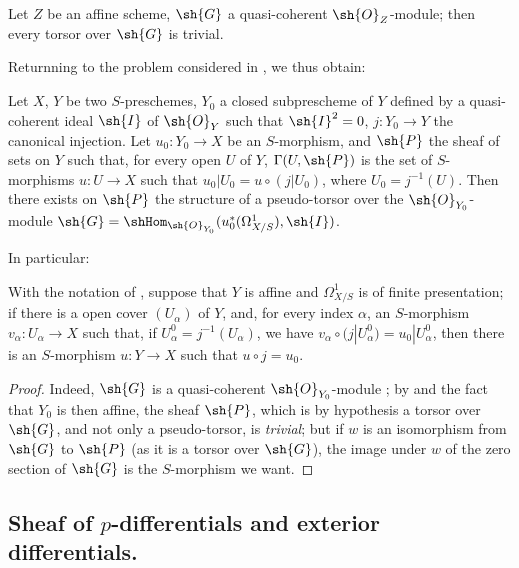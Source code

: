 \begin{proposition}[16.5.16]
\label{IV.16.5.16}
Let $Z$ be an affine scheme, $\sh{G}$ a quasi-coherent $\sh{O}_Z$-module;
then every torsor over $\sh{G}$ is trivial.
\end{proposition}

Returnning to the problem considered in , we thus obtain:

\begin{proposition}[16.5.17]
\label{IV.16.5.17}
Let $X$, $Y$ be two $S$-preschemes, $Y_0$ a closed subprescheme of $Y$ defined by a quasi-coherent ideal $\sh{I}$ of $\sh{O}_Y$ such that $\sh{I}^2 = 0$, $j : Y_0 \to Y$ the canonical injection.
Let $u_0:Y_0 \to X$ be an $S$-morphism, and $\sh{P}$ the sheaf of sets on $Y$ such that, for every open $U$ of $Y$, $\Gamma(U, \sh{P})$ is the set of $S$-morphisms $u : U \to X$ such that $u_0|U_0 = u \circ (j|U_0)$, where $U_0 = j^{-1}(U)$.
Then there exists on $\sh{P}$ the structure of a pseudo-torsor over the $\sh{O}_{Y_0}$-module $\sh{G} = \shHom_{\sh{O}_{Y_0}}(u_0^*(\Omega_{X/S}^1), \sh{I})$.
\end{proposition}

In particular:

\begin{corollary}[16.5.18]
\label{IV.16.5.18}
With the notation of , suppose that $Y$ is affine and $\Omega_{X/S}^1$ is of finite presentation;
if there is a open cover $(U_\alpha)$ of $Y$, and, for every index $\alpha$, an $S$-morphism $v_\alpha : U_\alpha \to X$ such that, if $U_\alpha^0 = j^{-1}(U_\alpha)$, we have $v_\alpha \circ (j|U_\alpha^0) = u_0|U_\alpha^0$, then there is an $S$-morphism $u : Y \to X$ such that $u \circ j = u_0$.
\end{corollary}

\begin{proof}
Indeed, $\sh{G}$ is a quasi-coherent $\sh{O}_{Y_0}$-module ;
by  and the fact that $Y_0$ is then affine, the sheaf $\sh{P}$, which is by hypothesis a torsor over $\sh{G}$, and not only a pseudo-torsor, is \emph{trivial};
but if $w$ is an isomorphism from $\sh{G}$ to $\sh{P}$ (as it is a torsor over $\sh{G}$), the image under $w$ of the zero section of $\sh{G}$ is the $S$-morphism we want.
\end{proof}

\subsection{Sheaf of $p$-differentials and exterior differentials.}
\label{IV.16.6}


